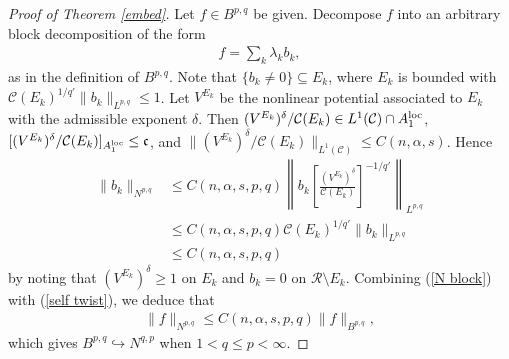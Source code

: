 \documentclass[10pt,reqno]{amsart}
\numberwithin{equation}{section}
\begin{document}
\begin{proof}[Proof of Theorem \ref{embed}]
Let $f\in B^{p,q}$ be given.  Decompose $f$ into an arbitrary block decomposition of the form
\begin{align*}
f=\sum_{k}\lambda_{k}b_{k},
\end{align*}
as in the definition of $B^{p,q}$. Note that $\{b_{k}\ne 0\}\subseteq E_{k}$, where $E_{k}$ is bounded with $\mathcal{C}(E_{k})^{1/q'}\|b_{k}\|_{L^{p,q}}\leq 1$. Let $V^{E_{k}}$ be the nonlinear potential associated to $E_{k}$ with the admissible exponent $\delta$. Then $(V^{E_{k}})^{\delta}/\mathcal{C}(E_{k})\in L^{1}(\mathcal{C})\cap A_{1}^{\rm loc}$, $[(V^{E_{k}})^{\delta}/\mathcal{C}(E_{k})]_{A_{1}^{\rm loc}}\leq\mathfrak{c}$, and $\|(V^{E_{k}})^{\delta}/\mathcal{C}(E_{k})\|_{L^{1}(\mathcal{C})}\leq C(n,\alpha,s)$. Hence
\begin{align*}
\|b_{k}\|_{N^{p,q}}&\leq C(n,\alpha,s,p,q)\left\|b_{k}\left[\frac{(V^{E_{k}})^{\delta}}{\mathcal{C}(E_{k})}\right]^{-1/q'}\right\|_{L^{p,q}}\\
&\leq C(n,\alpha,s,p,q)\mathcal{C}(E_{k})^{1/q'}\|b_{k}\|_{L^{p,q}}\\
&\leq C(n,\alpha,s,p,q)
\end{align*}
by noting that $(V^{E_{k}})^{\delta}\geq 1$ on $E_{k}$ and $b_{k}=0$ on $\mathcal{R}\setminus E_{k}$. Combining (\ref{N block}) with (\ref{self twist}), we deduce that 
\begin{align*}
\|f\|_{N^{p,q}}\leq C(n,\alpha,s,p,q)\|f\|_{B^{p,q}},
\end{align*}
which gives $B^{p,q}\hookrightarrow N^{q,p}$ when $1<q\leq p<\infty$.


\end{proof}
\end{document}
